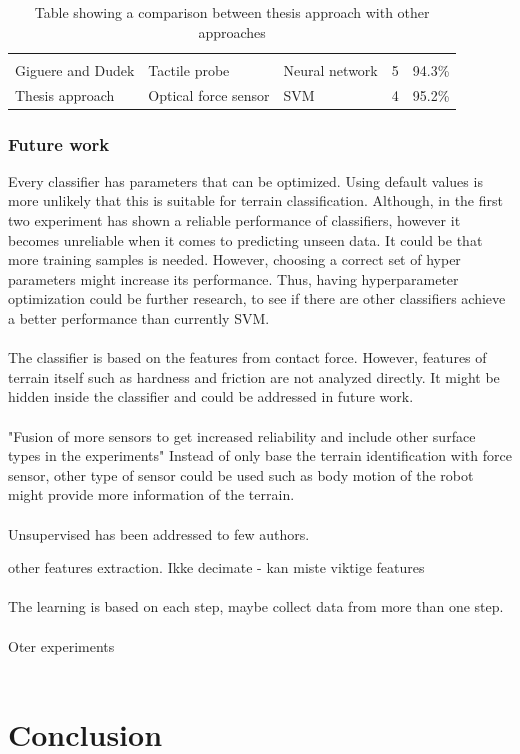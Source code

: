 \documentclass[USenglish]{ifimaster}  %
\begin{document}
\begin{table}[h]
{\begin{tabular}{@{}lllll@{}}
			&  &  &  &  \\
			\multirow{2}{*}{Giguere and Dudek \cite{5752869}} & \multirow{2}{*}{Tactile probe} & \multirow{2}{*}{Neural network} & \multirow{2}{*}{5} & \multirow{2}{*}{94.3\%} \\
			&  &  &  &  \\
			\multirow{2}{*}{Thesis approach} & \multirow{2}{*}{Optical force sensor} & \multirow{2}{*}{SVM} & \multirow{2}{*}{4} & \multirow{2}{*}{95.2\%} \\
			&  &  &  &  \\ \bottomrule
		\end{tabular}%
	}
	\caption{Table showing a comparison between thesis approach with other approaches}
	\label{table:compareEarly}
\end{table}

\subsection{Future work}
Every classifier has parameters that can be optimized. Using default values is more unlikely that this is suitable for terrain classification. Although, in the first two experiment has shown a reliable performance of classifiers, however it becomes unreliable when it comes to predicting unseen data. It could be that more training samples is needed. However, choosing a correct set of hyper parameters might increase its performance. Thus, having hyperparameter optimization could be further research, to see if there are other classifiers achieve a better performance than currently SVM.
\\
\\
The classifier is based on the features from contact force. However, features of terrain itself such as hardness and friction are not analyzed directly. It might be hidden inside the classifier and could be addressed in future work. 
\\
\\
"Fusion of more sensors to get increased reliability and include other surface types in the experiments"
Instead of only base the terrain identification with force sensor, other type of sensor could be used such as body motion of the robot might provide more information of the terrain.  
\\
\\
Unsupervised has been addressed to few authors.

other features extraction.
Ikke decimate - kan miste viktige features
\\
\\
The learning is based on each step, maybe collect data from more than one step.
\\
\\
Oter experiments
\\
\\





\chapter{Conclusion}


\backmatter{}


\end{document}
